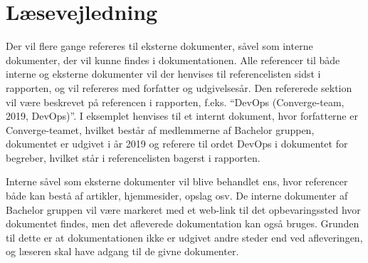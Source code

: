 \chapter{Læsevejledning}

Der vil flere gange refereres til eksterne dokumenter, såvel som interne dokumenter, der vil kunne findes i dokumentationen. Alle referencer til både interne og eksterne dokumenter vil der henvises til referencelisten sidst i rapporten, og vil refereres med forfatter og udgivelsesår. Den refererede sektion vil være beskrevet på referencen i rapporten, f.eks. “DevOps (Converge-team, 2019, DevOps)”. I eksemplet henvises til et internt dokument, hvor forfatterne er Converge-teamet, hvilket består af medlemmerne af Bachelor gruppen, dokumentet er udgivet i år 2019 og referere til ordet DevOps i dokumentet for begreber, hvilket står i referencelisten bagerst i rapporten.

Interne såvel som eksterne dokumenter vil blive behandlet ens, hvor referencer både kan bestå af artikler, hjemmesider, opslag osv. De interne dokumenter af Bachelor gruppen vil være markeret med et web-link til det opbevaringssted hvor dokumentet findes, men det afleverede dokumentation kan også bruges. Grunden til dette er at dokumentationen ikke er udgivet andre steder end ved afleveringen, og læseren skal have adgang til de givne dokumenter.


